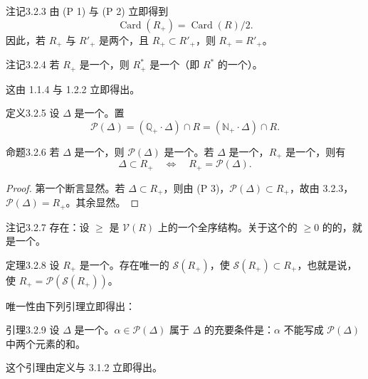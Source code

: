 \begin{SGAresult}{注记}{3.2.3}
由 (P 1) 与 (P 2) 立即得到
\[\operatorname{Card}(R_+)=\operatorname{Card}(R)/2.\]
因此，若 $R_+$ 与 $R'_+$ 是两个，且 $R_+\subset R'_+$，则 $R_+=R'_+$。
\end{SGAresult}
\begin{SGAresult}{注记}{3.2.4}
若 $R_+$ 是一个，则 $R_+^*$ 是一个（即 $R^*$ 的一个）。
\end{SGAresult}
这由 1.1.4 与 1.2.2 立即得出。
\begin{SGAresult}{定义}{3.2.5}
设 $\Delta$ 是一个。置
\[\mathscr P(\Delta)=(\mathbb Q_+\cdot\Delta)\cap R=(\mathbb N_+\cdot\Delta)\cap R.\]
\end{SGAresult}
\begin{SGAresult}{命题}{3.2.6}
若 $\Delta$ 是一个，则 $\mathscr P(\Delta)$ 是一个。若 $\Delta$ 是一个，$R_+$ 是一个，则有
\[\Delta\subset R_+\quad\Longleftrightarrow\quad R_+=\mathscr P(\Delta).\]
\end{SGAresult}
\begin{proof}
第一个断言显然。若 $\Delta\subset R_+$，则由 (P 3)，$\mathscr P(\Delta)\subset R_+$，故由 3.2.3，$\mathscr P(\Delta)=R_+$。其余显然。
\end{proof}
\begin{SGAresult}{注记}{3.2.7}
存在：设 $\geq$ 是 $\mathscr V(R)$ 上的一个全序结构。关于这个的 $\geq0$ 的的，就是一个。
\end{SGAresult}
\begin{SGAresult}{定理}{3.2.8}
设 $R_+$ 是一个。存在唯一的 $\mathscr S(R_+)$，使 $\mathscr S(R_+)\subset R_+$，也就是说，使 $R_+=\mathscr P(\mathscr S(R_+))$。
\end{SGAresult}
唯一性由下列引理立即得出：
\begin{SGAresult}{引理}{3.2.9}
设 $\Delta$ 是一个。$\alpha\in\mathscr P(\Delta)$ 属于 $\Delta$ 的充要条件是：$\alpha$ 不能写成 $\mathscr P(\Delta)$ 中两个元素的和。
\end{SGAresult}
这个引理由定义与 3.1.2 立即得出。

